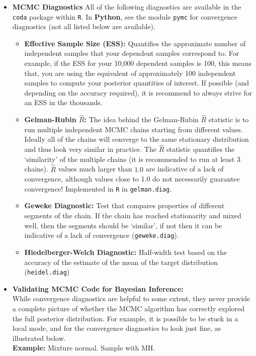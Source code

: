 \documentclass[11pt]{article}
\begin{document}
\begin{itemize}
   \item \textbf{MCMC Diagnostics}
    All of the following diagnostics are available in the \texttt{coda} package within \texttt{R}. In \textbf{Python}, see the module \texttt{pymc} for convergence diagnostics (not all listed below are available).
    \begin{itemize}
    \item \textbf{Effective Sample Size (ESS):} Quantifies the approximate number of independent samples that your dependent samples correspond to. For example, if the ESS for your 10,000 dependent samples is 100, this means that, you are using the equivalent of approximately 100 independent samples to compute your posterior quantities of interest. If possible (and depending on the accuracy required), it is recommend to always strive for an ESS in the thousands. 
    \item \textbf{Gelman-Rubin $\hat{R}$:} The idea behind the Gelman-Rubin $\hat{R}$ statistic is to run multiple independent MCMC chains starting from different values. Ideally all of the chains will converge to the same stationary distribution and thus look very similar in practice. The $\hat{R}$ statistic quantifies the \lq{}similarity\rq{} of the multiple chains (it is recommended to run at least 3 chains). $\hat{R}$ values much larger than $1.0$ are indicative of a lack of convergence, although values close to 1.0 do not necessarily guarantee convergence! Implemented in \texttt{R} in \texttt{gelman.diag}.
    \item \textbf{Geweke Diagnostic:} Test that compares properties of different segments of the chain. If the chain has reached stationarity and mixed well, then the segments should be \lq{}similar\rq{}, if not then it can be indicative of a lack of convergence (\texttt{geweke.diag}).
    \item \textbf{Hiedelberger-Welch Diagnostic:} Half-width test based on the accuracy of the estimate of the mean of the target distribution (\texttt{heidel.diag})
    \end{itemize}


 \item \textbf{Validating MCMC Code for Bayesian Inference:}\\$ $\\
  While convergence diagnostics are helpful to some extent, they never provide a complete picture of whether the MCMC algorithm has correctly explored the full posterior distribution. For example, it is possible to be stuck in a local mode, and for the convergence diagnostics to look just fine, as illustrated below.\\$ $\\
  \textbf{Example:} Mixture normal. Sample with MH. 
  

\end{itemize}
\end{document}
